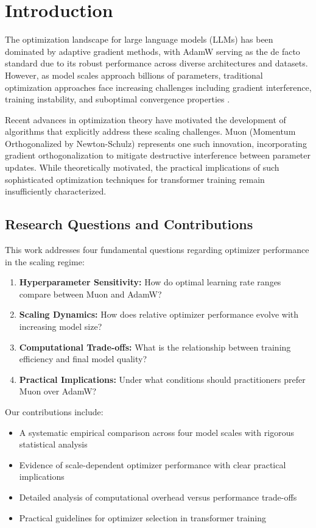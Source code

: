 \documentclass[11pt,a4paper]{article}
\begin{document}
\section{Introduction}

The optimization landscape for large language models (LLMs) has been dominated by adaptive gradient methods, with AdamW \cite{loshchilov2017decoupled} serving as the de facto standard due to its robust performance across diverse architectures and datasets. However, as model scales approach billions of parameters, traditional optimization approaches face increasing challenges including gradient interference, training instability, and suboptimal convergence properties \cite{vaswani2017attention,touvron2023llama}.

Recent advances in optimization theory have motivated the development of algorithms that explicitly address these scaling challenges. Muon (Momentum Orthogonalized by Newton-Schulz) represents one such innovation, incorporating gradient orthogonalization to mitigate destructive interference between parameter updates. While theoretically motivated, the practical implications of such sophisticated optimization techniques for transformer training remain insufficiently characterized.

\subsection{Research Questions and Contributions}

This work addresses four fundamental questions regarding optimizer performance in the scaling regime:

\begin{enumerate}[leftmargin=*]
    \item \textbf{Hyperparameter Sensitivity:} How do optimal learning rate ranges compare between Muon and AdamW?
    \item \textbf{Scaling Dynamics:} How does relative optimizer performance evolve with increasing model size?
    \item \textbf{Computational Trade-offs:} What is the relationship between training efficiency and final model quality?
    \item \textbf{Practical Implications:} Under what conditions should practitioners prefer Muon over AdamW?
\end{enumerate}

Our contributions include:
\begin{itemize}[leftmargin=*]
    \item A systematic empirical comparison across four model scales with rigorous statistical analysis
    \item Evidence of scale-dependent optimizer performance with clear practical implications
    \item Detailed analysis of computational overhead versus performance trade-offs
    \item Practical guidelines for optimizer selection in transformer training
\end{itemize}
\end{document}
